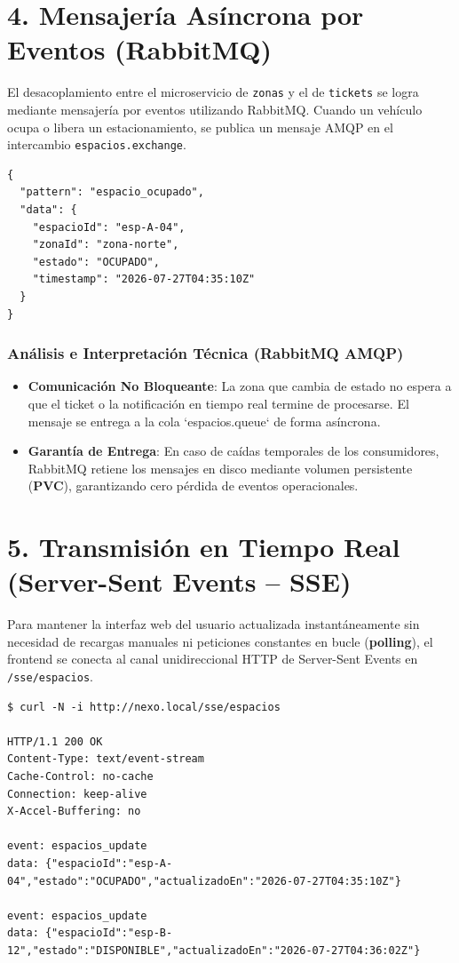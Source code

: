 \documentclass[11pt,a4paper]{article}
\begin{document}
\section{4. Mensajería Asíncrona por Eventos (RabbitMQ)}

El desacoplamiento entre el microservicio de \texttt{zonas} y el de \texttt{tickets} se logra mediante mensajería por eventos utilizando RabbitMQ. Cuando un vehículo ocupa o libera un estacionamiento, se publica un mensaje AMQP en el intercambio \texttt{espacios.exchange}.

\begin{macdraculacode}
\begin{lstlisting}
{
  "pattern": "espacio_ocupado",
  "data": {
    "espacioId": "esp-A-04",
    "zonaId": "zona-norte",
    "estado": "OCUPADO",
    "timestamp": "2026-07-27T04:35:10Z"
  }
}
\end{lstlisting}
\end{macdraculacode}

\subsubsection{Análisis e Interpretación Técnica (RabbitMQ AMQP)}
\begin{itemize}[leftmargin=*]
    \item \textbf{Comunicación No Bloqueante}: La zona que cambia de estado no espera a que el ticket o la notificación en tiempo real termine de procesarse. El mensaje se entrega a la cola `espacios.queue` de forma asíncrona.
    \item \textbf{Garantía de Entrega}: En caso de caídas temporales de los consumidores, RabbitMQ retiene los mensajes en disco mediante volumen persistente (\textbf{PVC}), garantizando cero pérdida de eventos operacionales.
\end{itemize}

\section{5. Transmisión en Tiempo Real (Server-Sent Events -- SSE)}

Para mantener la interfaz web del usuario actualizada instantáneamente sin necesidad de recargas manuales ni peticiones constantes en bucle (\textbf{polling}), el frontend se conecta al canal unidireccional HTTP de Server-Sent Events en \texttt{/sse/espacios}.

\begin{macdraculacode}
\begin{lstlisting}
$ curl -N -i http://nexo.local/sse/espacios

HTTP/1.1 200 OK
Content-Type: text/event-stream
Cache-Control: no-cache
Connection: keep-alive
X-Accel-Buffering: no

event: espacios_update
data: {"espacioId":"esp-A-04","estado":"OCUPADO","actualizadoEn":"2026-07-27T04:35:10Z"}

event: espacios_update
data: {"espacioId":"esp-B-12","estado":"DISPONIBLE","actualizadoEn":"2026-07-27T04:36:02Z"}
\end{lstlisting}
\end{macdraculacode}
\end{document}
